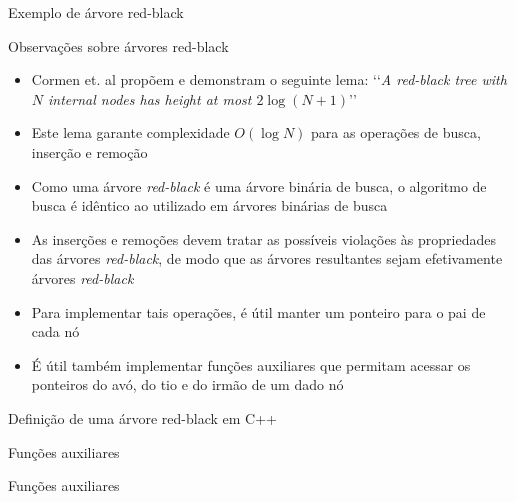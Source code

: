 \begin{frame}[fragile]{Exemplo de árvore red-black}

\end{frame}

\begin{frame}[fragile]{Observações sobre árvores red-black}

    \begin{itemize}
        \item Cormen et. al propõem e demonstram o seguinte lema: \lq\lq\textit{A red-black tree 
            with $N$ internal nodes has height at most $2\log(N + 1)$}\rq\rq

        \item Este lema garante complexidade $O(\log N)$ para as operações de busca, inserção e
            remoção

        \item Como uma árvore \textit{red-black} é uma árvore binária de busca, o algoritmo de
            busca é idêntico ao utilizado em árvores binárias de busca

        \item As inserções e remoções devem tratar as possíveis violações às propriedades das
            árvores \textit{red-black}, de modo que as árvores resultantes sejam efetivamente
            árvores \textit{red-black}

        \item Para implementar tais operações, é útil manter um ponteiro para o pai de cada nó

        \item É útil também implementar funções auxiliares que permitam acessar os ponteiros
            do avó, do tio e do irmão de um dado nó
    \end{itemize}

\end{frame}

\begin{frame}[fragile]{Definição de uma árvore red-black em C++}
\end{frame}

\begin{frame}[fragile]{Funções auxiliares}
\end{frame}

\begin{frame}[fragile]{Funções auxiliares}
\end{frame}
